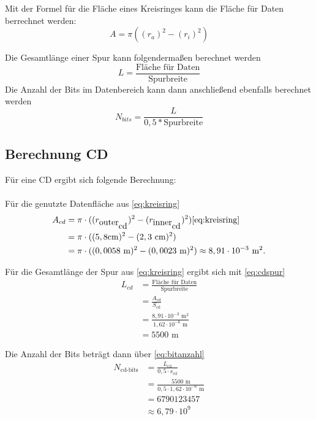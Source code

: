 \documentclass[9pt,twocolumn,twoside]{pnas-new}
\begin{document}
Mit der Formel für die Fläche eines Kreisringes \cite[Seite 147]{Bartsch2014} kann die Fläche für Daten berrechnet werden: \begin{equation} \label{eq:kreisring} A = \pi((r_a)^2-(r_i)^2)  \end{equation} 

Die Gesamtlänge einer Spur kann folgendermaßen berechnet werden \begin{equation} \label{eq:gesamtlänge} L = \frac{\mbox{Fläche für Daten}}{\mbox{Spurbreite}} \end{equation}
Die Anzahl der Bits im Datenbereich kann dann anschließend ebenfalls berechnet werden \begin{equation} \label{eq:bitanzahl} N_{bits} = \frac{L}{0,5*\mbox{Spurbreite}} \end{equation}

\subsection{Berechnung CD}
Für eine CD ergibt sich folgende Berechnung: \\ \\
Für die genutzte Datenfläche aus \eqref{eq:kreisring}
\begin{align*}
 A_{cd} &= \pi\cdot((r_{\mbox{outer}_{\mbox{cd}}})^2-(r_{\mbox{inner}_{\mbox{cd}}})^2)  \ref{eq:kreisring}\\	
&= \pi\cdot((5,8\mbox{cm})^2-(2,3\mbox{ cm})^2) \\
 &=  \pi\cdot((0,0058\mbox{ m})^2-(0,0023\mbox{ m})^2) \approx  8,91\cdot10^{-3}\mbox{ m}^2.
\end{align*}

Für die Gesamtlänge der Spur aus \ref{eq:kreisring} ergibt sich mit \eqref{eq:cdspur}
\begin{align*}
 L_{cd} &= \frac{\mbox{Fläche für Daten}}{\mbox{Spurbreite}}\\
 &= \frac{A_{\mbox{cd}}}{S_{\mbox{cd}}}\\
 &= \frac{8,91\cdot10^{-3}\mbox{ m}^2}{1,62\cdot10^{-6}\mbox{ m} }\\
 &= 5500\mbox{ m}
\end{align*}

Die Anzahl der Bits beträgt dann über \eqref{eq:bitanzahl}
\begin{align*}
N_{\mbox{cd-bits}} &=  \frac{L_{\mbox{cd}}}{0,5\cdot s_{\mbox{cd}}}\\
&= \frac{5500\mbox{ m}}{0,5 \cdot 1,62 \cdot 10^{-6}\mbox{ m}}\\
&= 6790123457 \\
&\approx 6,79 \cdot 10^9
\end{align*}
\end{document}
